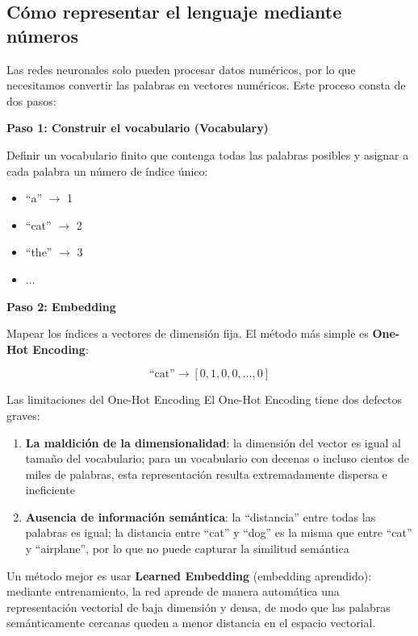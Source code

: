 \documentclass[a4paper]{article}
\begin{document}
\subsection{Cómo representar el lenguaje mediante números}

Las redes neuronales solo pueden procesar datos numéricos, por lo que necesitamos convertir las palabras en vectores numéricos. Este proceso consta de dos pasos:

\textbf{Paso 1: Construir el vocabulario (Vocabulary)}

Definir un vocabulario finito que contenga todas las palabras posibles y asignar a cada palabra un número de índice único:
\begin{itemize}
    \item ``a'' $\rightarrow$ 1
    \item ``cat'' $\rightarrow$ 2
    \item ``the'' $\rightarrow$ 3
    \item $\ldots$
\end{itemize}

\textbf{Paso 2: Embedding}

Mapear los índices a vectores de dimensión fija. El método más simple es \textbf{One-Hot Encoding}:

$$\text{``cat''} \rightarrow [0, 1, 0, 0, \ldots, 0]$$

\begin{warningbox}{Las limitaciones del One-Hot Encoding}
El One-Hot Encoding tiene dos defectos graves:
\begin{enumerate}
    \item \textbf{La maldición de la dimensionalidad}: la dimensión del vector es igual al tamaño del vocabulario; para un vocabulario con decenas o incluso cientos de miles de palabras, esta representación resulta extremadamente dispersa e ineficiente
    \item \textbf{Ausencia de información semántica}: la ``distancia'' entre todas las palabras es igual; la distancia entre ``cat'' y ``dog'' es la misma que entre ``cat'' y ``airplane'', por lo que no puede capturar la similitud semántica
\end{enumerate}
\end{warningbox}

Un método mejor es usar \textbf{Learned Embedding} (embedding aprendido): mediante entrenamiento, la red aprende de manera automática una representación vectorial de baja dimensión y densa, de modo que las palabras semánticamente cercanas queden a menor distancia en el espacio vectorial.
\end{document}
